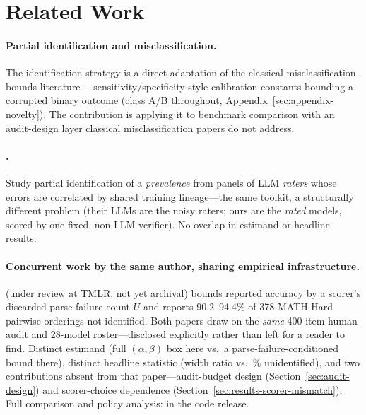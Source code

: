 \section{Related Work}
\label{sec:related-work}

\paragraph{Partial identification and misclassification.} The identification
strategy is a direct adaptation of the classical misclassification-bounds
literature \citep{manski1995identification,molinari2008partial}---sensitivity/specificity-style
calibration constants bounding a corrupted binary outcome (class A/B
throughout, Appendix~\ref{sec:appendix-novelty}). The contribution is
applying it to benchmark comparison with an audit-design layer classical
misclassification papers do not address.

\paragraph{\citet{chen2026partial}.} Study partial identification of a
\emph{prevalence} from panels of LLM \emph{raters} whose errors are
correlated by shared training lineage---the same toolkit, a structurally
different problem (their LLMs are the noisy raters; ours are the
\emph{rated} models, scored by one fixed, non-LLM verifier). No overlap in
estimand or headline results.

\paragraph{Concurrent work by the same author, sharing empirical
infrastructure.} \citet{pall2026identified} (under review at TMLR, not yet
archival) bounds reported accuracy by a scorer's discarded parse-failure
count $U$ and reports 90.2--94.4\% of 378 MATH-Hard pairwise orderings not
identified. Both papers draw on the \emph{same} 400-item human audit and
28-model roster---disclosed explicitly rather than left for a reader to
find. Distinct estimand (full $(\alpha,\beta)$ box here vs.\ a
parse-failure-conditioned bound there), distinct headline statistic (width
ratio vs.\ \% unidentified), and two contributions absent from that
paper---audit-budget design (Section~\ref{sec:audit-design}) and
scorer-choice dependence (Section~\ref{sec:results-scorer-mismatch}).
Full comparison and policy analysis: 
in the code release.

